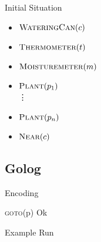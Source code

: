 \begin{frame}[fragile]{Initial Situation}
    \begin{itemize}
        \item $\textsc{WateringCan}(c)$
        \item $\textsc{Thermometer}(t)$
        \item $\textsc{Moisturemeter}(m)$
        \item $\textsc{Plant}(p_1)$ \\
        \hspace{0.5cm}\vdots
        \item $\textsc{Plant}(p_n)$
        \item $\textsc{Near}(c)$
    \end{itemize}
\end{frame}


    

\subsection{Golog}

\begin{frame}{Encoding}
    \begin{algorithmic}[1]
            \textsc{goto}(p)
            Ok
        \EndWhile
    \end{algorithmic}
\end{frame}

\begin{frame}{Example Run}
    
\end{frame}
